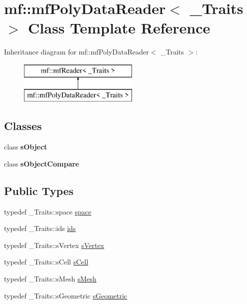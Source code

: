 \hypertarget{classmf_1_1mfPolyDataReader}{
\section{mf::mfPolyDataReader$<$ \_\-Traits $>$ Class Template Reference}
\label{classmf_1_1mfPolyDataReader}
}
Inheritance diagram for mf::mfPolyDataReader$<$ \_\-Traits $>$:\begin{figure}[H]
\begin{center}
\leavevmode
\includegraphics[height=2.000000cm]{classmf_1_1mfPolyDataReader}
\end{center}
\end{figure}
\subsection*{Classes}
\begin{DoxyCompactItemize}
\item 
class {\bfseries sObject}
\item 
class {\bfseries sObjectCompare}
\end{DoxyCompactItemize}
\subsection*{Public Types}
\begin{DoxyCompactItemize}
\item 
typedef \_\-Traits::space \hyperlink{classmf_1_1mfPolyDataReader_ab5c4255c5e508f817feaacc8aafd8bb9}{space}
\item 
typedef \_\-Traits::ids \hyperlink{classmf_1_1mfPolyDataReader_a1d1a716d5dd72816147f86518dcd20a0}{ids}
\item 
typedef \_\-Traits::sVertex \hyperlink{classmf_1_1mfPolyDataReader_a51d78f02cab20097f62a78134bf7d0f3}{sVertex}
\item 
typedef \_\-Traits::sCell \hyperlink{classmf_1_1mfPolyDataReader_a712889726fe13348e13c23990d0d412b}{sCell}
\item 
typedef \_\-Traits::sMesh \hyperlink{classmf_1_1mfPolyDataReader_a5343a659b464b89fc0c8b58ee56ed568}{sMesh}
\item 
typedef \_\-Traits::sGeometric \hyperlink{classmf_1_1mfPolyDataReader_af064c717a7483939d46991da73d4304d}{sGeometric}
\end{DoxyCompactItemize}
